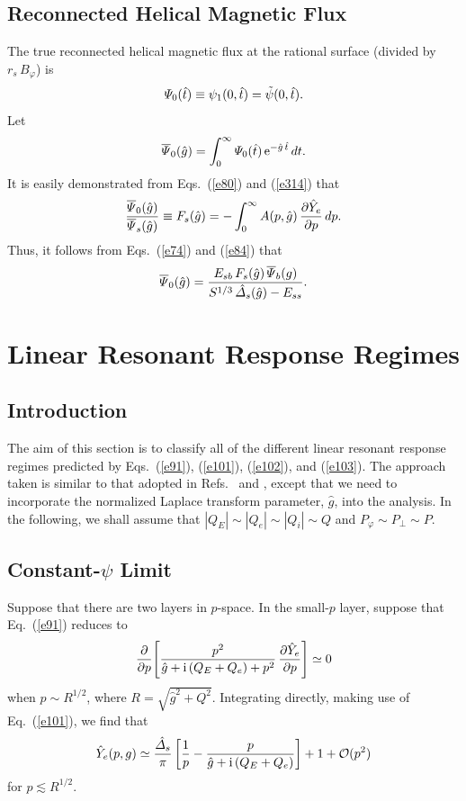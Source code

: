 \documentclass[12pt,prb,aps]{revtex4-1}
\begin{document}
\subsection{Reconnected Helical Magnetic Flux}\label{recon}
The true reconnected helical magnetic flux at the rational surface (divided by $r_s\,B_\varphi$)  is
\begin{equation}
{\mit\Psi}_0(\hat{t}) \equiv \psi_1(0,\hat{t}) = \tilde{\psi}(0,\hat{t}).
\end{equation}
Let 
\begin{equation}
\overline{\mit\Psi}_0(\hat{g}) = \int_0^\infty {\mit\Psi}_0(\hat{t})\,{\rm e}^{-\hat{g}\,\hat{t}}\,dt.
\end{equation}
It is easily demonstrated from Eqs.~(\ref{e80}) and (\ref{e314}) that\,\cite{rf1}
\begin{equation}\label{e103}
\frac{\overline{\mit\Psi}_0(\hat{g})}{\overline{\mit\Psi}_s(\hat{g})}\equiv F_s(\hat{g}) = -\int_0^\infty A(p,\hat{g})\,\frac{\partial \hat{Y}_e}{\partial p}\,dp.
\end{equation}
Thus, it follows from Eqs.~(\ref{e74}) and (\ref{e84}) 
that
\begin{equation}\label{e110}
\overline{\mit\Psi}_0(\hat{g}) =\frac{ E_{sb}\,F_s(\hat{g})\,\overline{\mit\Psi}_b(g)}{S^{1/3}\,\hat{\mit\Delta}_s(\hat{g})-E_{ss}}.
\end{equation}

\section{Linear Resonant Response Regimes}\label{response}
\subsection{Introduction}
The aim of this section is to classify all of the different linear resonant response regimes predicted by Eqs.~(\ref{e91}), (\ref{e101}), (\ref{e102}), and (\ref{e103}). The approach taken is similar to that adopted in Refs.~ and ,
except that we need to incorporate the normalized Laplace transform parameter, $\hat{g}$, into the analysis. In the following, we shall
assume that $|Q_E|\sim |Q_e|\sim |Q_i| \sim Q$ and $P_\varphi\sim P_\perp\sim P$. 

\subsection{Constant-$\psi$ Limit}\label{scpl}
Suppose that there are two layers in $p$-space. In the small-$p$ layer, suppose that Eq.~(\ref{e91}) reduces to
\begin{equation}
\frac{\partial}{\partial p}\!\left[\frac{p^2}{\hat{g}+{\rm i}\,(Q_E+Q_e)+p^2}\,\frac{\partial\hat{Y}_e}{\partial p}\right]\simeq 0
\end{equation}
when $p \sim R^{1/2}$, where $R= \sqrt{\hat{g}^2+ Q^2}$. 
 Integrating directly, making use of Eq.~(\ref{e101}), we find that
\begin{equation}\label{e107}
\hat{Y}_e(p,g)\simeq \frac{\hat{\mit\Delta}_s}{\pi}\left[\frac{1}{p} - \frac{p}{\hat{g}+{\rm i}\,(Q_E+Q_e)}\right] + 1 + {\cal O}(p^2)
\end{equation}
for $p \lesssim R^{1/2}$.
\end{document}
